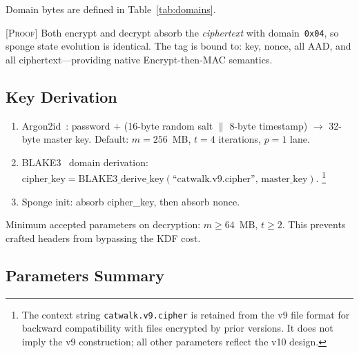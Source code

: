 \documentclass[runningheads]{llncs}
\newcommand{\proof}[1]{\textsc{[Proof]} #1}
\begin{document}
Domain bytes are defined in Table~\ref{tab:domains}.

\proof{Both encrypt and decrypt absorb the \emph{ciphertext} with
domain~\texttt{0x04}, so sponge state evolution is identical.
The tag is bound to: key, nonce, all AAD, and all ciphertext---providing
native Encrypt-then-MAC semantics.}

\subsection{Key Derivation}

\begin{enumerate}[nosep]
\item Argon2id~\cite{rfc9106}: password $+$ (16-byte random salt $\|$ 8-byte timestamp)
  $\to$ 32-byte master key.  Default: $m = 256$~MB, $t = 4$ iterations, $p = 1$ lane.
\item BLAKE3~\cite{blake3} domain derivation:
  $\mathrm{cipher\_key} = \mathrm{BLAKE3\_derive\_key}(\text{``catwalk.v9.cipher''},\, \mathrm{master\_key})$.%
  \footnote{The context string \texttt{catwalk.v9.cipher}
  is retained from the v9 file format for backward
  compatibility with files encrypted by prior versions.
  It does not imply the v9 construction; all other
  parameters reflect the v10 design.}
\item Sponge init: absorb cipher\_key, then absorb nonce.
\end{enumerate}

Minimum accepted parameters on decryption: $m \geq 64$~MB, $t \geq 2$.
This prevents crafted headers from bypassing the KDF cost.

\subsection{Parameters Summary}
\end{document}
